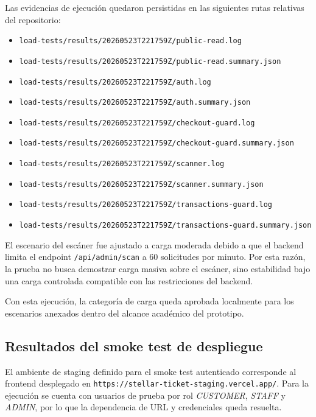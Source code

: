 \documentclass[12pt,letterpaper]{article}
\begin{document}
Las evidencias de ejecución quedaron persistidas en las siguientes rutas relativas del repositorio:

\begin{itemize}
    \item \texttt{load-tests/results/20260523T221759Z/public-read.log}
    \item \texttt{load-tests/results/20260523T221759Z/public-read.summary.json}
    \item \texttt{load-tests/results/20260523T221759Z/auth.log}
    \item \texttt{load-tests/results/20260523T221759Z/auth.summary.json}
    \item \texttt{load-tests/results/20260523T221759Z/checkout-guard.log}
    \item \texttt{load-tests/results/20260523T221759Z/checkout-guard.summary.json}
    \item \texttt{load-tests/results/20260523T221759Z/scanner.log}
    \item \texttt{load-tests/results/20260523T221759Z/scanner.summary.json}
    \item \texttt{load-tests/results/20260523T221759Z/transactions-guard.log}
    \item \texttt{load-tests/results/20260523T221759Z/transactions-guard.summary.json}
\end{itemize}

El escenario del escáner fue ajustado a carga moderada debido a que el backend limita el endpoint \texttt{/api/admin/scan} a 60 solicitudes por minuto. Por esta razón, la prueba no busca demostrar carga masiva sobre el escáner, sino estabilidad bajo una carga controlada compatible con las restricciones del backend.

Con esta ejecución, la categoría de carga queda aprobada localmente para los escenarios anexados dentro del alcance académico del prototipo.

\subsection{Resultados del smoke test de despliegue}

El ambiente de staging definido para el smoke test autenticado corresponde al frontend desplegado en \texttt{https://stellar-ticket-staging.vercel.app/}. Para la ejecución se cuenta con usuarios de prueba por rol \textit{CUSTOMER}, \textit{STAFF} y \textit{ADMIN}, por lo que la dependencia de URL y credenciales queda resuelta.
\end{document}
